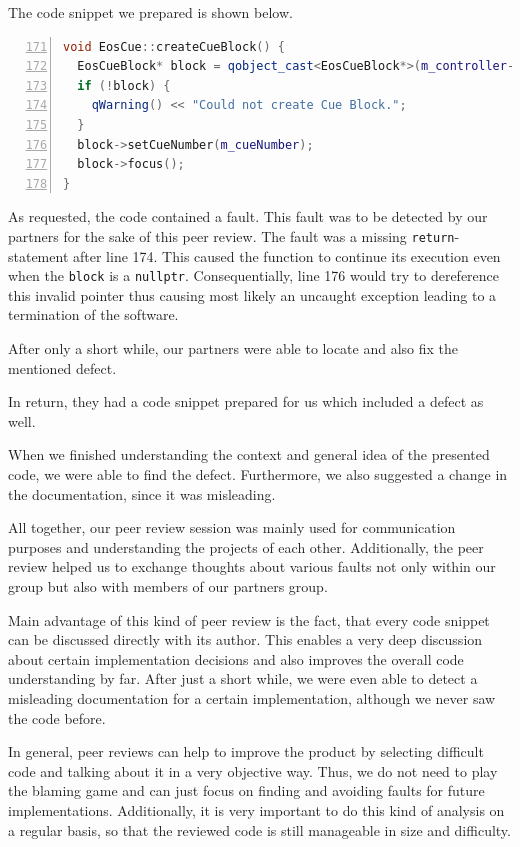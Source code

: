 \documentclass{scrreprt}
\begin{document}
The code snippet we prepared is shown below.

\bigskip
\begin{lstlisting}[language=C++,
					numbers=left,
					firstnumber=171,
					directivestyle={\color{black}}
					emph={int,char,double,float,unsigned},
					emphstyle={\color{blue}},
					title=src/eos\_specific/EosCue.cpp]
void EosCue::createCueBlock() {
  EosCueBlock* block = qobject_cast<EosCueBlock*>(m_controller->blockManager()->addNewBlock("Eos Cue"));
  if (!block) {
    qWarning() << "Could not create Cue Block.";
  }
  block->setCueNumber(m_cueNumber);
  block->focus();
}
\end{lstlisting}
\bigskip

As requested, the code contained a fault. This fault was to be detected by our partners for the sake of this peer review.
The fault was a missing \texttt{return}-statement after line 174. This caused the function to continue its execution even when the \texttt{block} is a \texttt{nullptr}. Consequentially, line 176 would try to dereference this invalid pointer thus causing most likely an uncaught exception leading to a termination of the software.

After only a short while, our partners were able to locate and also fix the mentioned defect.

In return, they had a code snippet prepared for us which included a defect as well. 


When we finished understanding the context and general idea of the presented code, we were able to find the defect. Furthermore, we also suggested a change in the documentation, since it was misleading.

All together, our peer review session was mainly used for communication purposes and understanding the projects of each other. Additionally, the peer review helped us to exchange thoughts about various faults not only within our group but also with members of our partners group.

Main advantage of this kind of peer review is the fact, that every code snippet can be discussed directly with its author. This enables a very deep discussion about certain implementation decisions and also improves the overall code understanding by far. After just a short while, we were even able to detect a misleading documentation for a certain implementation, although we never saw the code before. 

In general, peer reviews can help to improve the product by selecting difficult code and talking about it in a very objective way. Thus, we do not need to play the blaming game and can just focus on finding and avoiding faults for future implementations. Additionally, it is very important to do this kind of analysis on a regular basis, so that the reviewed code is still manageable in size and difficulty. 
\end{document}
